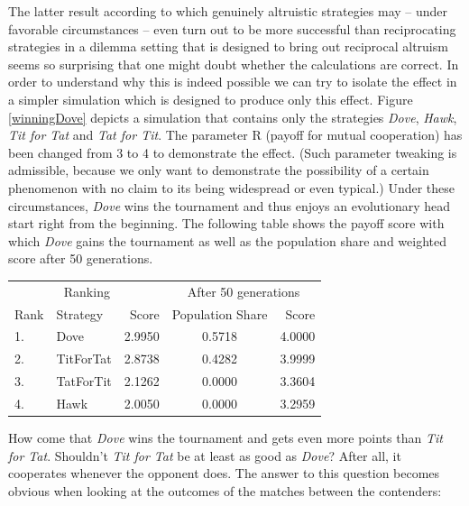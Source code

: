The latter result according to which genuinely altruistic strategies may --
under favorable circumstances -- even turn out to be more successful than
reciprocating strategies in a dilemma setting that is designed to bring out
reciprocal altruism seems so surprising that one might doubt whether the
calculations are correct. In order to understand why this 
is indeed possible we can try to isolate the effect in a simpler
simulation which is designed to produce only this effect. Figure
\ref{winningDove} depicts a simulation that contains only the strategies {\em
  Dove}, {\em Hawk}, {\em Tit for Tat} and {\em Tat for Tit}. The parameter R
(payoff for mutual cooperation) has been changed from 3 to 4 to demonstrate
the effect. (Such parameter tweaking is admissible, because we only want to
demonstrate the possibility of a certain phenomenon with no claim to its being
widespread or even typical.) Under these circumstances, {\em Dove} wins the
tournament and thus enjoys an evolutionary head start right from the
beginning. The following table shows the payoff score with which {\em Dove}
gains the tournament as well as the population share and weighted score after
50 generations.

\begin{center}
\begin{tabular}{llr|cr}
\multicolumn{3}{c}{Ranking} & \multicolumn{2}{c}{After 50 generations} \\
Rank & Strategy   & Score  &  Population Share & Score \\ \hline

1.   & Dove       & 2.9950 &            0.5718 & 4.0000 \\
2.   & TitForTat  & 2.8738 &            0.4282 & 3.9999 \\
3.   & TatForTit  & 2.1262 &            0.0000 & 3.3604 \\
4.   & Hawk       & 2.0050 &            0.0000 & 3.2959 \\
\end{tabular}
\end{center}

How come that {\em Dove} wins the tournament and gets even more points than
{\em Tit for Tat}. Shouldn't {\em Tit for Tat} be at least as good as {\em
  Dove}? After all, it cooperates whenever the opponent does. The answer to
this question becomes obvious when looking at the outcomes of the matches
between the contenders:

